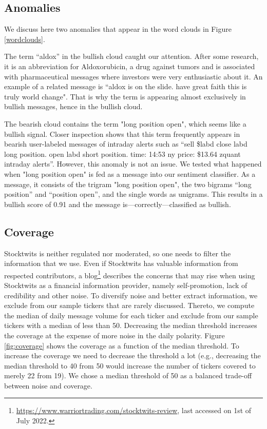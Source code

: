 \subsection{Anomalies} \label{app_ano}

We discuss here two anomalies that appear in the word clouds in Figure \ref{wordclouds}.

The term ``aldox'' in the bullish cloud caught our attention. After some research, it is an abbreviation for Aldoxorubicin, a drug against tumors and is associated with pharmaceutical messages where investors were very enthusiastic about it. An example of a related message is ``aldox is on the slide. have great faith this is truly world change". That is why the term is appearing almost exclusively in bullish messages, hence in the bullish cloud.

The bearish cloud contains the term "long position open", which seems like a bullish signal. Closer inspection shows that this term frequently appears in bearish user-labeled messages of intraday alerts such as ``sell \$labd close labd long position. open labd short position. time: 14:53 ny price: \$13.64 zquant intraday alerts''. However, this anomaly is not an issue. We tested what happened when "long position open" is fed as a message into our sentiment classifier. As a message, it consists of the trigram "long position open", the two bigrams ``long position'' and ``position open'', and the single words as unigrams. This results in a bullish score of 0.91 and the message is---correctly---classified as bullish. 




\subsection{Coverage}\label{app_coverage}

Stocktwits is neither regulated nor moderated, so one needs to filter the information that we use. Even if Stocktwits has valuable information from respected contributors, a blog\footnote{\url{https://www.warriortrading.com/stocktwits-review}, last accessed on 1st of July 2022.} describes the concerns that may rise when using Stocktwits as a financial information provider, namely self-promotion, lack of credibility and other noise. To diversify noise and better extract information, we exclude from our sample tickers that are rarely discussed. Thereto, we compute the median of daily message volume for each ticker and exclude from our sample tickers with a median of less than 50. Decreasing the median threshold increases the coverage at the expense of more noise in the daily polarity. Figure \ref{fig:coverage} shows the coverage as a function of the median threshold. To increase the coverage we need to decrease the threshold a lot (e.g., decreasing the median threshold to 40 from 50 would increase the number of tickers covered to merely 22 from 19). We chose a median threshold of 50 as a balanced trade-off between noise and coverage. 

